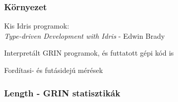 \documentclass[bigger]{beamer}
\begin{document}
\begin{frame}[fragile]
\frametitle{Környezet}

	\vspace{1.5cm}
	\begin{vfitemize}
		\item Kis Idris programok: \\
		\textit{Type-driven Development with Idris} - Edwin Brady
		\item Interpretált GRIN programok, és futtatott gépi kód is
		\item Fordítasi- és futásidejú mérések
	\end{vfitemize}

	\vspace{-0.5cm}
	\begin{figure}[H] 
		\centering
		\begin{adjustbox}{scale = 0.75}
			
		\end{adjustbox}
	\end{figure}

\end{frame}



\begin{frame}[fragile]
\frametitle{Length - GRIN statisztikák}
	
	\begin{figure}
		\hspace{-1cm}
		\begin{minipage}{0.45\textwidth}
		\end{minipage}
		\hspace{1cm}
		\begin{minipage}{0.45\textwidth}
		\end{minipage}
	\end{figure}
	
\end{frame}
\end{document}
